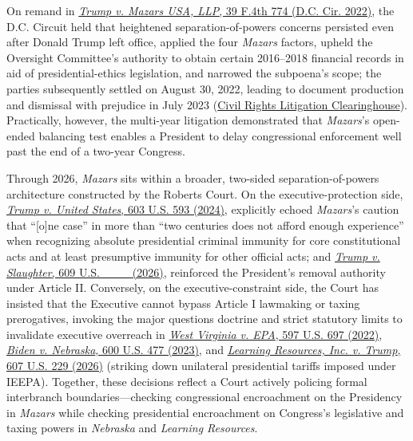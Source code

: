 \documentclass[12pt]{article}
\begin{document}
On remand in \href{https://law.justia.com/cases/federal/appellate-courts/cadc/21-5176/21-5176-2022-07-08.html}{\textit{Trump v. Mazars USA, LLP}, 39 F.4th 774 (D.C. Cir. 2022)}, the D.C. Circuit held that heightened separation-of-powers concerns persisted even after Donald Trump left office, applied the four \textit{Mazars} factors, upheld the Oversight Committee's authority to obtain certain 2016--2018 financial records in aid of presidential-ethics legislation, and narrowed the subpoena's scope; the parties subsequently settled on August 30, 2022, leading to document production and dismissal with prejudice in July 2023 (\href{https://clearinghouse.net/case/17222/}{Civil Rights Litigation Clearinghouse}). Practically, however, the multi-year litigation demonstrated that \textit{Mazars}'s open-ended balancing test enables a President to delay congressional enforcement well past the end of a two-year Congress.

Through 2026, \textit{Mazars} sits within a broader, two-sided separation-of-powers architecture constructed by the Roberts Court. On the executive-protection side, \href{https://supreme.justia.com/cases/federal/us/603/23-939/}{\textit{Trump v. United States}, 603 U.S. 593 (2024)}, explicitly echoed \textit{Mazars}'s caution that ``[o]ne case'' in more than ``two centuries does not afford enough experience'' when recognizing absolute presidential criminal immunity for core constitutional acts and at least presumptive immunity for other official acts; and \href{https://supreme.justia.com/cases/federal/us/609/25-332/}{\textit{Trump v. Slaughter}, 609 U.S. \_\_\_ (2026)}, reinforced the President's removal authority under Article II. Conversely, on the executive-constraint side, the Court has insisted that the Executive cannot bypass Article I lawmaking or taxing prerogatives, invoking the major questions doctrine and strict statutory limits to invalidate executive overreach in \href{https://supreme.justia.com/cases/federal/us/597/20-1530/}{\textit{West Virginia v. EPA}, 597 U.S. 697 (2022)}, \href{https://supreme.justia.com/cases/federal/us/600/22-506/}{\textit{Biden v. Nebraska}, 600 U.S. 477 (2023)}, and \href{https://supreme.justia.com/cases/federal/us/607/24-1287/}{\textit{Learning Resources, Inc. v. Trump}, 607 U.S. 229 (2026)} (striking down unilateral presidential tariffs imposed under IEEPA). Together, these decisions reflect a Court actively policing formal interbranch boundaries---checking congressional encroachment on the Presidency in \textit{Mazars} while checking presidential encroachment on Congress's legislative and taxing powers in \textit{Nebraska} and \textit{Learning Resources}.
\end{document}
